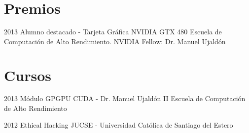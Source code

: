 \documentclass[]{cv-style}          %
\begin{document}



\section{Premios}

\begin{entrylist}
\entry
{2013}
{Alumno destacado - Tarjeta Gráfica NVIDIA GTX 480}
{Escuela de Computación de Alto Rendimiento. NVIDIA Fellow: Dr. Manuel Ujaldón}
{}
\end{entrylist}

\section{Cursos}

\begin{entrylist}
\entry
{2013}
{Módulo GPGPU CUDA - Dr. Manuel Ujaldón}
{II Escuela de Computación de Alto Rendimiento}
{}
\end{entrylist}

\begin{entrylist}
\entry
{2012}
{Ethical Hacking}
{JUCSE - Universidad Católica de Santiago del Estero}
{}
\end{entrylist}
\end{document}

